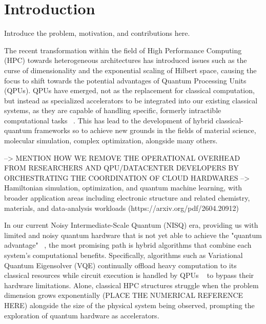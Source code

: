 \section{Introduction}
\label{sec:introduction}

Introduce the problem, motivation, and contributions here.

    The recent transformation within the field of High Performance Computing (HPC) towards heterogeneous architectures has 
    introduced issues such as the curse of dimensionality and the exponential scaling of Hilbert space, 
    causing the focus to shift towards the potential advantages of Quantum Processing Units (QPUs). 
    QPUs have emerged, not as the replacement for classical computation, but 
    instead as specialized accelerators to be integrated into our existing classical systems, as they are capable of handling 
    specific, formerly intractible computational tasks ~\parencite{rallis2025interfacingquantumcomputingsystems}. This has lead to the 
    development of hybrid classical-quantum frameworks so to achieve new grounds in the fields of material science, 
    molecular simulation, complex optimization, alongside many others.   

    --> MENTION HOW WE REMOVE THE OPERATIONAL OVERHEAD FROM RESEARCHERS AND QPU/DATACENTER DEVELOPERS BY ORCHESTRATING THE COORDINATION OF CLOUD HARDWARES
    --> Hamiltonian simulation, optimization, and quantum machine learning, with broader
application areas including electronic structure and related chemistry, materials, and data-analysis
workloads  (https://arxiv.org/pdf/2604.20912)

    In our current Noisy Intermediate-Scale Quantum (NISQ) era, providing us with limited and noisy quantum hardware that is not yet 
    able to achieve the "quantum advantage" ~\parencite{harrow2017quantumsupremacy}, the most promising path 
    is hybrid algorithms that combine each system's computational benefits.  
    Specifically, algorithms such as Variational Quantum Eigensolver (VQE) continually offload heavy computation to its classical resources while 
    circuit execution is handled by QPUs ~\parencite{peruzzo2014variational, rallis2025interfacingquantumcomputingsystems} to bypass their hardware limitations. 
    Alone, classical HPC structures struggle when the problem dimension grows exponentially (PLACE THE NUMERICAL REFERENCE HERE) alongside 
    the size of the physical system being observed, prompting the exploration of quantum hardware as accelerators. 

